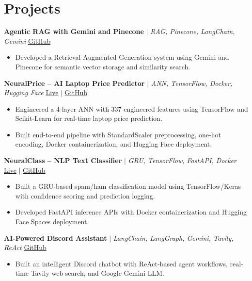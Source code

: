 \documentclass[a4paper,9pt]{article}
\newcommand{\resumeItem}[1]{\item\small #1}
\begin{document}
\vspace{-2mm}

\section{Projects}

\noindent\textbf{Agentic RAG with Gemini and Pinecone} $|$ \textit{RAG, Pinecone, LangChain, Gemini} \hfill
\href{https://github.com/hsachan295-source/Agentic-RAG-with-Gemini-and-Pinecone}{\small GitHub}
\begin{itemize}
\resumeItem{Developed a Retrieval-Augmented Generation system using Gemini and Pinecone for semantic vector storage and similarity search.}
\end{itemize}

\vspace{1.5pt}
\noindent\textbf{NeuralPrice -- AI Laptop Price Predictor} $|$ \textit{ANN, TensorFlow, Docker, Hugging Face} \hfill
\href{https://huggingface.co/spaces/Harsh0809/laptop-price-predictor-Ann}{\small Live} $|$
\href{https://github.com/hsachan295-source/Laptop-Price-Prediction-ANN}{\small GitHub}
\begin{itemize}
\resumeItem{Engineered a 4-layer ANN with 337 engineered features using TensorFlow and Scikit-Learn for real-time laptop price prediction.}
\resumeItem{Built end-to-end pipeline with StandardScaler preprocessing, one-hot encoding, Docker containerization, and Hugging Face deployment.}
\end{itemize}

\vspace{1.5pt}
\noindent\textbf{NeuralClass -- NLP Text Classifier} $|$ \textit{GRU, TensorFlow, FastAPI, Docker} \hfill
\href{https://huggingface.co/spaces/Harsh0809/gru-text-classifier}{\small Live} $|$
\href{https://github.com/hsachan295-source/Email-Spam-Detector}{\small GitHub}
\begin{itemize}
\resumeItem{Built a GRU-based spam/ham classification model using TensorFlow/Keras with confidence scoring and prediction logging.}
\resumeItem{Developed FastAPI inference APIs with Docker containerization and Hugging Face Spaces deployment.}
\end{itemize}

\vspace{1.5pt}
\noindent\textbf{AI-Powered Discord Assistant} $|$ \textit{LangChain, LangGraph, Gemini, Tavily, ReAct} \hfill
\href{https://github.com/hsachan295-source/AI-Powered-Discord-Assistant}{\small GitHub}
\begin{itemize}
\resumeItem{Built an intelligent Discord chatbot with ReAct-based agent workflows, real-time Tavily web search, and Google Gemini LLM.}
\end{itemize}
\end{document}
